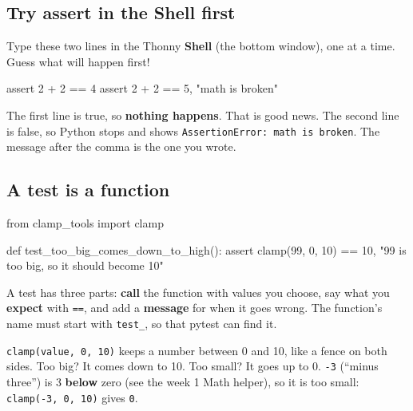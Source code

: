 \subsection{Try assert in the Shell first}
Type these two lines in the Thonny \textbf{Shell} (the bottom window), one at a time. Guess what will happen first!
\begin{pycode}
assert 2 + 2 == 4
assert 2 + 2 == 5, "math is broken"
\end{pycode}
The first line is true, so \textbf{nothing happens}. That is good news. The second line is false, so Python stops and shows
\texttt{AssertionError: math is broken}. The message after the comma is the one you wrote.

\subsection{A test is a function}
\begin{pycode}
from clamp_tools import clamp

def test_too_big_comes_down_to_high():
    assert clamp(99, 0, 10) == 10, "99 is too big, so it should become 10"
\end{pycode}
A test has three parts: \textbf{call} the function with values you choose, say what you \textbf{expect} with \texttt{==}, and add a
\textbf{message} for when it goes wrong. The function's name must start with \texttt{test\_}, so that pytest can find it.

\begin{tip}
\texttt{clamp(value, 0, 10)} keeps a number between 0 and 10, like a fence on both sides. Too big? It comes down to 10.
Too small? It goes up to 0. \texttt{-3} (\enquote{minus three}) is 3 \textbf{below} zero (see the week 1 Math helper),
so it is too small: \texttt{clamp(-3, 0, 10)} gives \texttt{0}.
\end{tip}

